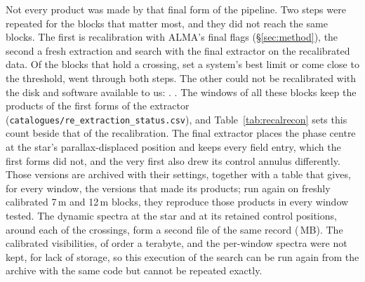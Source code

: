 Not every product was made by that final form of the pipeline. Two steps
were repeated for the blocks that matter most, and they did not reach the
same blocks. The first is recalibration with ALMA's final flags
(\S\ref{sec:method}), the second a fresh extraction and search with the
final extractor on the recalibrated data. Of
the \XgNBlkPlan{} blocks that hold a crossing, set a system's best limit or
come close to the threshold, \XgNBlkReDone{} went through both steps. The
other \XgNBlkNotRe{} could not be recalibrated with the disk and software
available to us: \XgNotReClause. \LrNotReClause. The windows of all these blocks keep
the products of the first forms of the extractor
(\texttt{catalogues/\allowbreak re\_extraction\_status.csv}), and
Table~\ref{tab:recalrecon} sets this count beside that of the
recalibration. The final extractor places the phase
centre at the star's parallax-displaced position and keeps every field entry,
which the first forms did not, and the very first also drew its control
annulus differently. Those versions are archived with their settings,
together with a table that gives, for every window, the versions that made
its products; run again on freshly calibrated 7\,m and 12\,m blocks, they
reproduce those products in every window tested. The dynamic spectra at the
star and at its \RcNRetCtrl{} retained control positions, around each of the
\DaNSpecCross{} crossings, form a second file of the same record
(\DaSpecFileMB\,MB). The calibrated visibilities, of order a terabyte, and the
per-window spectra were not kept, for lack of storage, so this execution of
the search can be run again from the archive with the same code but cannot be
repeated exactly.
